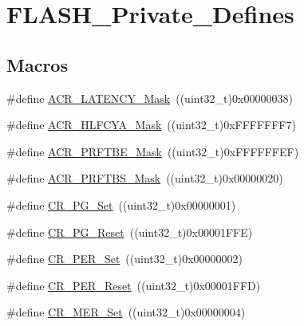 \hypertarget{group___f_l_a_s_h___private___defines}{}\section{F\+L\+A\+S\+H\+\_\+\+Private\+\_\+\+Defines}
\label{group___f_l_a_s_h___private___defines}
\subsection*{Macros}
\begin{DoxyCompactItemize}
\item 
\#define \mbox{\hyperlink{group___f_l_a_s_h___private___defines_ga5f1112c5731f01b063fdf2461efbedf7}{A\+C\+R\+\_\+\+L\+A\+T\+E\+N\+C\+Y\+\_\+\+Mask}}~((uint32\+\_\+t)0x00000038)
\item 
\#define \mbox{\hyperlink{group___f_l_a_s_h___private___defines_ga6b6f73163f3a90f5072b6b7dc9fb63b7}{A\+C\+R\+\_\+\+H\+L\+F\+C\+Y\+A\+\_\+\+Mask}}~((uint32\+\_\+t)0x\+F\+F\+F\+F\+F\+F\+F7)
\item 
\#define \mbox{\hyperlink{group___f_l_a_s_h___private___defines_gaf95fa450690ce94c4f4357e4dd72791a}{A\+C\+R\+\_\+\+P\+R\+F\+T\+B\+E\+\_\+\+Mask}}~((uint32\+\_\+t)0x\+F\+F\+F\+F\+F\+F\+E\+F)
\item 
\#define \mbox{\hyperlink{group___f_l_a_s_h___private___defines_ga257768fe5d61ac49f43b6b90ba413102}{A\+C\+R\+\_\+\+P\+R\+F\+T\+B\+S\+\_\+\+Mask}}~((uint32\+\_\+t)0x00000020)
\item 
\#define \mbox{\hyperlink{group___f_l_a_s_h___private___defines_gaf4fdb45c4a4d30dcddc389ec920f720f}{C\+R\+\_\+\+P\+G\+\_\+\+Set}}~((uint32\+\_\+t)0x00000001)
\item 
\#define \mbox{\hyperlink{group___f_l_a_s_h___private___defines_gadda1a996e1867e911aaa7b0f30eb6834}{C\+R\+\_\+\+P\+G\+\_\+\+Reset}}~((uint32\+\_\+t)0x00001\+F\+F\+E)
\item 
\#define \mbox{\hyperlink{group___f_l_a_s_h___private___defines_ga6e5e45c62f559102546b40de50c700bd}{C\+R\+\_\+\+P\+E\+R\+\_\+\+Set}}~((uint32\+\_\+t)0x00000002)
\item 
\#define \mbox{\hyperlink{group___f_l_a_s_h___private___defines_gad564767c401a1a9c36b71342448fd256}{C\+R\+\_\+\+P\+E\+R\+\_\+\+Reset}}~((uint32\+\_\+t)0x00001\+F\+F\+D)
\item 
\#define \mbox{\hyperlink{group___f_l_a_s_h___private___defines_ga7e5cf18b31b5ed960cd05a816cadf973}{C\+R\+\_\+\+M\+E\+R\+\_\+\+Set}}~((uint32\+\_\+t)0x00000004)
\item 

\end{DoxyCompactItemize}
